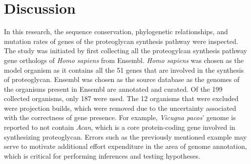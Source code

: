\documentclass{article}
\begin{document}
\section*{Discussion}
In this research, the sequence conservation, phylogenetic relationships, and mutation rates of genes of the proteoglycan synthesis pathway were inspected. The study was initiated by first collecting all the proteogylcan synthesis pathway gene orthologs of \textit{Homo sapiens} from Ensembl. \textit{Homo sapiens} was chosen as the model organism as it contains all the 51 genes that are involved in the synthesis of proteoglycan. Ensembl was chosen as the source database as the genomes of the organisms present in Ensembl are annotated and curated. Of the 199 collected organisms, only 187 were used. The 12 organisms that were excluded were projection builds, which were removed due to the uncertainty associated with the correctness of gene presence. For example, \textit{Vicugna pacos}' genome is reported to not contain \textit{Acan}, which is a core protein-coding gene involved in synthesizing proteoglycan. Errors such as the previously mentioned example may serve to motivate additional effort expenditure in the area of genome annotation, which is critical for performing inferences and testing hypotheses. 
\end{document}
